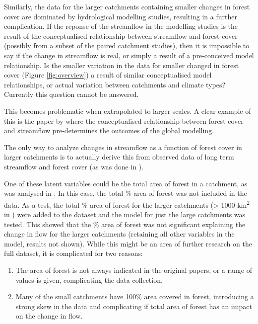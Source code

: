 \documentclass[]{elsarticle} %
\providecommand{\tightlist}{%
  \setlength{\itemsep}{0pt}\setlength{\parskip}{0pt}}
\begin{document}
Similarly, the data for the larger catchments containing smaller changes in forest cover are dominated by hydrological modelling studies, resulting in a further complication. If the reponse of the streamflow in the modelling studies is the result of the conceptualised relationship between streamflow and forest cover (possibly from a subset of the paired catchment studies), then it is impossible to say if the change in streamflow is real, or simply a result of a pre-conceived model relationship. Is the smaller variation in the data for smaller changed in forest cover (Figure \ref{fig:overview}) a result of similar conceptualised model relationships, or actual variation between catchments and climate types? Currently this question cannot be answered.

This becomes problematic when extrapolated to larger scales. A clear example of this is the paper by \citet{hoekvandijke2022} where the conceptualised relationship between forest cover and streamflow pre-determines the outcomes of the global modelling.

The only way to analyze changes in streamflow as a function of forest cover in larger catchments is to actually derive this from observed data of long term streamflow and forest cover (as was done in \citet{levy2018}).

One of these latent variables could be the total area of forest in a catchment, as was analysed in \citet{levy2018}. In this case, the total \% area of forest was not included in the data. As a test, the total \% area of forest for the larger catchments (\textgreater{} 1000 km\textsuperscript{2} in \citet{zhang2017}) were added to the dataset and the model for just the large catchments was tested. This showed that the \% area of forest was not significant explaining the change in flow for the larger catchments (retaining all other variables in the model, results not shown). While this might be an area of further research on the full dataset, it is complicated for two reasons:

\begin{enumerate}
\def\labelenumi{\arabic{enumi}.}
\tightlist
\item
  The area of forest is not always indicated in the original papers, or a range of values is given, complicating the data collection.
\item
  Many of the small catchments have 100\% area covered in forest, introducing a strong skew in the data and complicating if total area of forest has an impact on the change in flow.
\end{enumerate}
\end{document}
